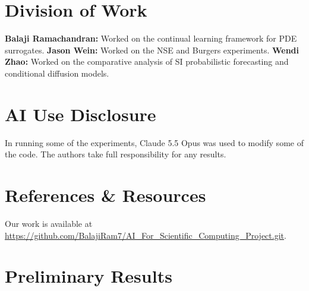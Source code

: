 \documentclass{article}
\begin{document}
\section{Division of Work}
\textbf{Balaji Ramachandran:} Worked on the continual learning framework for PDE surrogates.
\textbf{Jason Wein:} Worked on the NSE and Burgers experiments.
\textbf{Wendi Zhao:} Worked on the comparative analysis of SI probabilistic forecasting and conditional diffusion models.



\section{AI Use Disclosure}
In running some of the experiments, Claude 5.5 Opus was used to modify some of the code. The authors take full responsibility for any results.

\section{References \& Resources}
Our work is available at \url{https://github.com/BalajiRam7/AI_For_Scientific_Computing_Project.git}.






\newpage
\appendix
\section{Preliminary Results}
\end{document}
